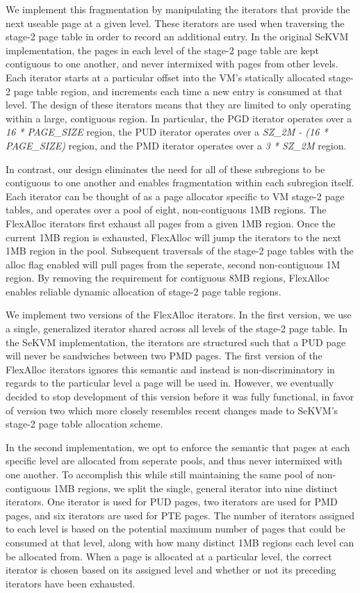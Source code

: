 We implement this fragmentation by manipulating the iterators that provide the next useable
page at a given level. These iterators are used when traversing the stage-2 page table in order to record
an additional entry. In the original SeKVM implementation, the pages in each level of the stage-2 page table are
kept contiguous to one another, and never intermixed with pages from other levels.
Each iterator starts at a particular offset into the VM's statically allocated stage-2
page table region, and increments each time a new entry is consumed at that level. The design of these iterators means that they are limited to
only operating within a large, contiguous region. In particular, the PGD iterator operates over a \textit{16 * PAGE\_SIZE} region, the PUD
iterator operates over a \textit{SZ\_2M - (16 * PAGE\_SIZE)} region, and the PMD iterator operates over a \textit{3 * SZ\_2M} region.

In contrast, our design eliminates the need for all of these subregions to be contiguous to
one another and enables fragmentation within each subregion itself. Each iterator can be thought of as a page allocator specific to VM stage-2
page tables, and operates over a pool of eight, non-contiguous 1MB regions. The FlexAlloc iterators
first exhaust all pages from a given 1MB region. Once the current 1MB region is exhausted, FlexAlloc
will jump the iterators to the next 1MB region in the pool. Subsequent traversals of the
stage-2 page tables with the alloc flag enabled will pull pages from the seperate, second
non-contiguous 1M region. By removing the requirement for contiguous 8MB regions, FlexAlloc
enables reliable dynamic allocation of stage-2 page table regions.

We implement two versions of the FlexAlloc iterators. In the first version, we use a single,
generalized iterator shared across all levels of the stage-2 page table. In the SeKVM implementation,
the iterators are structured such that a PUD page will never be sandwiches between two PMD pages.
The first version of the FlexAlloc iterators ignores this semantic and instead is non-discriminatory
in regards to the particular level a page will be used in. However, we eventually decided to stop development of this
version before it was fully functional, in favor of version two which more closely resembles recent changes made to SeKVM's
stage-2 page table allocation scheme.

In the second implementation, we opt to enforce the semantic that pages at each specific level are
allocated from seperate pools, and thus never intermixed with one another. To accomplish this while still maintaining the same pool of non-contiguous 1MB regions,
we split the single, general iterator into nine distinct iterators. One iterator is used
for PUD pages, two iterators are used for PMD pages, and six iterators are used for PTE pages.
The number of iterators assigned to each level is based on the potential maximum number of
pages that could be consumed at that level, along with how many distinct 1MB regions each level
can be allocated from. When a page is allocated at a particular level, the correct iterator is chosen based on
its assigned level and whether or not its preceding iterators have been exhausted.

